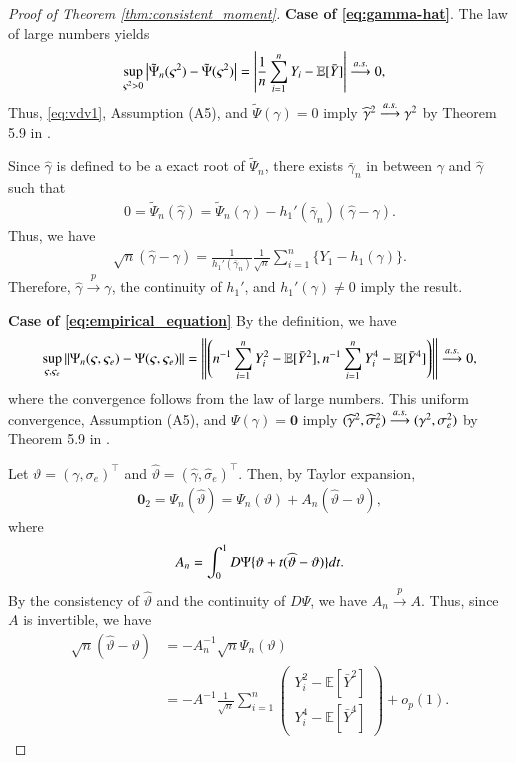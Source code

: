 \documentclass[12pt,reqno]{amsart}
\newcommand{\abs}[1]{\left\lvert#1\right\rvert}
\newcommand{\norm}[1]{\left\lVert#1\right\rVert}
\newcommand{\rbr}[1]{\left(#1\right)}
\newcommand{\E}{\mathbb{E}}
\newcommand{\ccc}{\color{black}}
\renewcommand{\hat}{\widehat}
\def\bzero{\bm{0}}
\newcommand{\pconv}{\overset{{p}}{\to}}
\begin{document}
\begin{proof}[Proof of Theorem \ref{thm:consistent_moment}] \textbf{Case of \eqref{eq:gamma-hat}}. The law of large numbers yields
\begin{align}
\label{eq:vdv1}
    &\sup_{\varsigma^2>0}\abs{\tilde\Psi_n(\varsigma^2)-\tilde\Psi(\varsigma^2)}=\abs{\frac{1}{n}\sum_{i=1}^nY_i-\E[\bar{Y}]}\overset{\rm a.s.}{\longrightarrow}0,
\end{align}
Thus, \eqref{eq:vdv1}, Assumption (A5), and $\tilde\Psi(\gamma)=0$ imply $\hat{\gamma}^2\overset{\rm a.s.}{\longrightarrow}\gamma^2$ by Theorem 5.9 in \cite{van2000asymptotic}.

{\ccc
Since $\hat\gamma$ is defined to be a exact root of $\tilde\Psi_n$, there exists $\bar\gamma_n$ in between $\gamma$ and $\hat\gamma$ such that
\begin{align*}
    0=\tilde\Psi_n(\hat\gamma)
    =\tilde\Psi_n(\gamma)-h_1'(\bar\gamma_n)(\hat\gamma-\gamma).
\end{align*}
Thus, we have
\begin{align*}
    \sqrt{n}(\hat\gamma-\gamma)
    =\frac{1}{h_1'(\bar\gamma_n)}\frac{1}{\sqrt{n}}\sum_{i=1}^n\{Y_1-h_1(\gamma)\}.
\end{align*}
Therefore, $\hat\gamma\pconv\gamma$, the continuity of $h_1'$, and $h_1'(\gamma)\neq0$ imply the result.
}

\textbf{Case of \eqref{eq:empirical_equation}} By the definition, we have
\begin{align}
    \sup_{\varsigma,\varsigma_e}\|\Psi_n(\varsigma,\varsigma_e)-\Psi(\varsigma,\varsigma_e)\|
    =\norm{\rbr{n^{-1}\sum_{i=1}^n Y_i^2-\E[\bar{Y}^2],n^{-1}\sum_{i=1}^n Y_i^4-\E[\bar{Y}^4]}}\overset{\rm a.s.}{\longrightarrow}0,
\end{align}
where the convergence follows from the law of large numbers. This uniform convergence, Assumption (A5), and $\Psi(\gamma)=\bzero$ imply $(\hat{\gamma}^2,\hat\sigma_e^2)\overset{\rm a.s.}{\longrightarrow}(\gamma^2,\sigma_e^2)$ by Theorem 5.9 in \cite{van2000asymptotic}.

{\ccc
Let $\vartheta=(\gamma,\sigma_e)^\top$ and $\hat\vartheta=(\hat\gamma,\hat\sigma_e)^\top$.
Then, by Taylor expansion,
\begin{align*}
    \bzero_2
    =\Psi_n(\hat\vartheta)
    =\Psi_n(\vartheta)+A_n(\hat\vartheta-\vartheta),
\end{align*}
where
\begin{align*}
    A_n=\int_0^1D\Psi\{\vartheta+t(\hat\vartheta-\vartheta)\}{\rm d}t.
\end{align*}
By the consistency of $\hat\vartheta$ and the continuity of $D\Psi$, we have $A_n\pconv A$. 
Thus, since $A$ is invertible, we have
\begin{align*}
    \sqrt{n}(\hat\vartheta-\vartheta)
    &=-A_n^{-1}\sqrt{n}\Psi_n(\vartheta)\\
    &=-A^{-1}\frac{1}{\sqrt{n}}\sum_{i=1}^n\begin{pmatrix}
            Y_i^2-\E[\bar Y^2]\\
            Y_i^4-\E[\bar Y^4]
        \end{pmatrix}
        +o_p(1).
\end{align*}
}
 \end{proof}
\end{document}
